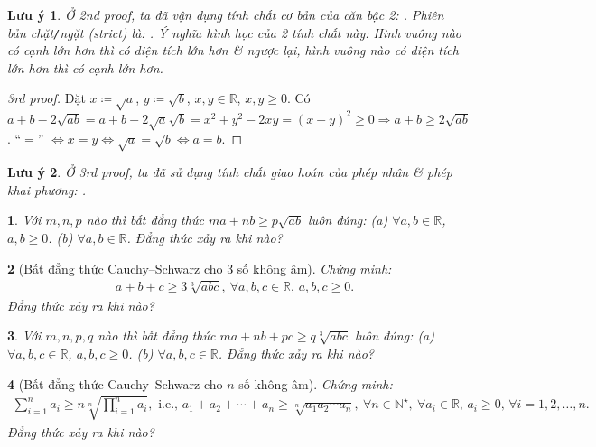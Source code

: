 \documentclass{article}
\newtheorem{baitoan}{}
\newtheorem{luuy}{Lưu ý}
\begin{document}
\begin{luuy}
	Ở 2nd proof, ta đã vận dụng tính chất cơ bản của căn bậc 2: . Phiên bản chặt\emph{\texttt{/}}ngặt (strict) là: . Ý nghĩa hình học của 2 tính chất này: Hình vuông nào có cạnh lớn hơn thì có diện tích lớn hơn \& ngược lại, hình vuông nào có diện tích lớn hơn thì có cạnh lớn hơn.
\end{luuy}

\begin{proof}[3rd proof]
	Đặt $x\coloneqq\sqrt{a}$, $y\coloneqq\sqrt{b}$, $x,y\in\mathbb{R}$, $x,y\ge0$. Có $a + b - 2\sqrt{ab} = a + b - 2\sqrt{a}\sqrt{b} = x^2 + y^2 - 2xy = (x - y)^2\ge0\Rightarrow a + b\ge2\sqrt{ab}$. ``$=$'' $\Leftrightarrow x = y\Leftrightarrow\sqrt{a} = \sqrt{b}\Leftrightarrow a = b$.
\end{proof}

\begin{luuy}
	Ở 3rd proof, ta đã sử dụng tính chất giao hoán của phép nhân \& phép khai phương: .
\end{luuy}

\begin{baitoan}
	Với $m,n,p$ nào thì bất đẳng thức $ma + nb\ge p\sqrt{ab}$ luôn đúng: (a) $\forall a,b\in\mathbb{R}$, $a,b\ge0$. (b) $\forall a,b\in\mathbb{R}$. Đẳng thức xảy ra khi nào?
\end{baitoan}

\begin{baitoan}[Bất đẳng thức Cauchy--Schwarz cho 3 số không âm]
	Chứng minh:
	\begin{align*}
		\boxed{a + b + c\ge3\sqrt[3]{abc},\ \forall a,b,c\in\mathbb{R},\,a,b,c\ge 0.}
	\end{align*}
	Đẳng thức xảy ra khi nào?
\end{baitoan}

\begin{baitoan}
	Với $m,n,p,q$ nào thì bất đẳng thức $ma + nb + pc\ge q\sqrt[3]{abc}$ luôn đúng: (a) $\forall a,b,c\in\mathbb{R}$, $a,b,c\ge0$. (b) $\forall a,b,c\in\mathbb{R}$. Đẳng thức xảy ra khi nào?
\end{baitoan}

\begin{baitoan}[Bất đẳng thức Cauchy--Schwarz cho $n$ số không âm]
	Chứng minh:
	\begin{align*}
		\sum_{i=1}^n a_i\ge n\sqrt[n]{\prod_{i=1}^n a_i},\mbox{ i.e., } a_1 + a_2 + \cdots + a_n\ge\sqrt[n]{a_1a_2\cdots a_n},\ \forall n\in\mathbb{N}^\star,\ \forall a_i\in\mathbb{R},\,a_i\ge0,\,\forall i = 1,2,\ldots,n.
	\end{align*}
	Đẳng thức xảy ra khi nào?
\end{baitoan}
\end{document}
